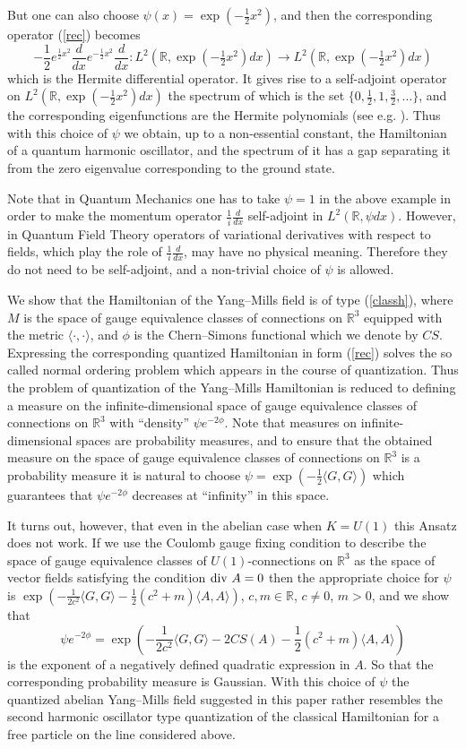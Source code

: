 \documentclass{amsart}
\begin{document}
But one can also choose $\psi(x)=\exp(-\frac12x^2)$, and then the corresponding operator (\ref{rec}) becomes 
$$
-\frac12e^{\frac12x^2}\frac{d}{dx}e^{-\frac12x^2}\frac{d}{dx}:L^2(\mathbb{R},\exp(-\tfrac12x^2)dx)\rightarrow L^2(\mathbb{R},\exp(-\tfrac12x^2)dx)
$$
which is the Hermite differential operator. It gives rise to a self-adjoint operator on $L^2(\mathbb{R},\exp(-\tfrac12x^2)dx)$ the spectrum of which is the set $\{0,\frac12,1,\frac32, \ldots\}$, and the corresponding eigenfunctions are the Hermite polynomials (see e.g. \cite{Herm}). Thus with this choice of $\psi$ we obtain, up to a non-essential constant, the Hamiltonian of a quantum harmonic oscillator, and the spectrum of it has a gap separating it from the zero eigenvalue corresponding to the ground state.

Note that in Quantum Mechanics one has to take $\psi =1$ in the above example in order to make the momentum operator $\frac 1i \frac{d}{dx}$ self-adjoint in $L^2(\mathbb{R}, \psi dx)$. However, in Quantum Field Theory operators of variational derivatives with respect to fields, which play the role of $\frac 1i \frac{d}{dx}$, may have no physical meaning. Therefore they do not need to be self-adjoint, and a non-trivial choice of $\psi$ is allowed.

We show that the Hamiltonian of the Yang--Mills field is of type (\ref{classh}), where $M$ is the space of gauge equivalence classes of connections on $\mathbb{R}^3$ equipped with the metric $\langle \cdot,\cdot\rangle $, and $\phi$ is the Chern--Simons functional which we denote by $CS$. Expressing the corresponding quantized Hamiltonian in form (\ref{rec}) solves the so called normal ordering problem which appears in the course of quantization. Thus the problem of quantization of the Yang--Mills Hamiltonian is reduced to defining a measure on the infinite-dimensional space of gauge equivalence classes of connections on $\mathbb{R}^3$ with ``density'' $\psi e^{-2\phi}$. Note that measures on infinite-dimensional spaces are probability measures, and to ensure that the obtained measure on the space of gauge equivalence classes of connections on $\mathbb{R}^3$ is a probability measure it is natural to choose $\psi=\exp(-\frac12\langle G,G\rangle )$ which guarantees that $\psi e^{-2\phi}$ decreases at ``infinity'' in this space.

It turns out, however, that even in the abelian case when $K=U(1)$ this Ansatz does not work. If we use the Coulomb gauge fixing condition to describe the space of gauge equivalence classes of $U(1)$-connections on $\mathbb{R}^3$ as the space of vector fields satisfying the condition ${\rm div}~A=0$ then the appropriate choice for $\psi$ is  $\exp(-\frac1{2c^2}\langle G,G\rangle -\frac12(c^2+m)\langle A,A\rangle )$, $c,m\in \mathbb{R}$, $c\neq 0$, $m>0$, and we show that
$$
\psi e^{-2\phi}=\exp(-\frac1{2c^2}\langle G,G\rangle -2CS(A)-\frac12(c^2+m)\langle A,A\rangle )	
$$    
is the exponent of a negatively defined quadratic expression in $A$. So that the corresponding probability measure is Gaussian. With this choice of $\psi$ the quantized abelian Yang--Mills field suggested in this paper rather resembles the second harmonic oscillator type quantization of the classical Hamiltonian for a free particle on the line considered above.   
\end{document}
